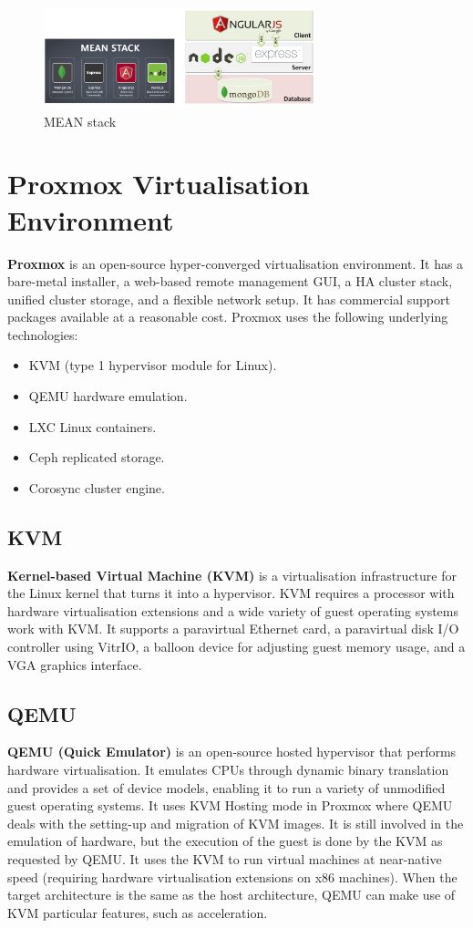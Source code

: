 \documentclass[a4paper,11pt]{article}
\begin{document}
\begin{figure}[H]
    \centering
    \includegraphics[width=0.7\textwidth]{./images/mean.png}
    \caption{ MEAN stack }
\end{figure}

\section{Proxmox Virtualisation Environment}
\textbf{Proxmox} is an open-source hyper-converged virtualisation environment.
It has a bare-metal installer, a web-based remote management GUI, a HA cluster stack, unified cluster storage, and a flexible network setup.
It has commercial support packages available at a reasonable cost.
Proxmox uses the following underlying technologies:
\begin{itemize}
    \item   KVM (type 1 hypervisor module for Linux).
    \item   QEMU hardware emulation.
    \item   LXC Linux containers.
    \item   Ceph replicated storage.
    \item   Corosync cluster engine.
\end{itemize}

\subsection{KVM}
\textbf{Kernel-based Virtual Machine (KVM)} is a virtualisation infrastructure for the Linux kernel that turns it into a hypervisor.
KVM requires a processor with hardware virtualisation extensions and a wide variety of guest operating systems work with KVM.
It supports a paravirtual Ethernet card, a paravirtual disk I/O controller using VitrIO, a balloon device for adjusting guest memory usage, and a VGA graphics interface.

\subsection{QEMU}
\textbf{QEMU (Quick Emulator)} is an open-source hosted hypervisor that performs hardware virtualisation.
It emulates CPUs through dynamic binary translation and provides a set of device models, enabling it to run a variety of unmodified guest operating systems.
It uses KVM Hosting mode in Proxmox where QEMU deals with the setting-up and migration of KVM images.
It is still involved in the emulation of hardware, but the execution of the guest is done by the KVM as requested by QEMU.
It uses the KVM to run virtual machines at near-native speed (requiring hardware virtualisation extensions on x86 machines).
When the target architecture is the same as the host architecture, QEMU can make use of KVM particular features, such as acceleration.
\end{document}
